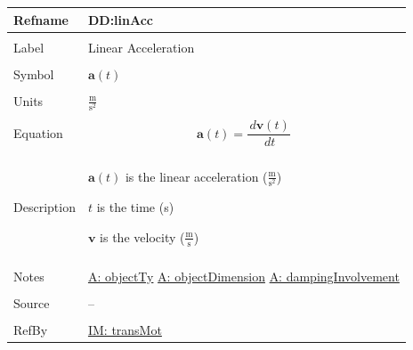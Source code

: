 \documentclass[12pt]{article}
\begin{document}
\noindent \begin{minipage}{\textwidth}
\begin{tabular}{>{\raggedright}p{}>{\raggedright\arraybackslash}p{}}
\toprule \textbf{Refname} & \textbf{DD:linAcc}
\label{DD:linAcc}
\\ \midrule \\
Label & Linear Acceleration
\\ \midrule \\
Symbol & $\mathbf{a}(t)$
\\ \midrule \\
Units & $\frac{\text{m}}{\text{s}^{2}}$
\\ \midrule \\
Equation & \begin{displaymath}
           \mathbf{a}(t)=\frac{\,d\mathbf{v}\left(t\right)}{\,dt}
           \end{displaymath}
\\ \midrule \\
Description & \begin{symbDescription}
              \item{$\mathbf{a}(t)$ is the linear acceleration ($\frac{\text{m}}{\text{s}^{2}}$)}
              \item{$t$ is the time (s)}
              \item{$\mathbf{v}$ is the velocity ($\frac{\text{m}}{\text{s}}$)}
              \end{symbDescription}
\\ \midrule \\
Notes & \hyperref[assumpOT]{A: objectTy}
        \hyperref[assumpOD]{A: objectDimension}
        \hyperref[assumpDI]{A: dampingInvolvement}
\\ \midrule \\
Source & --
\\ \midrule \\
RefBy & \hyperref[IM:transMot]{IM: transMot}
\\ \bottomrule
\end{tabular}
\end{minipage}
\par~
\end{document}
